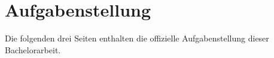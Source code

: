 \chapter{Aufgabenstellung}
\label{sec:aufgabenstellung}
Die folgenden drei Seiten enthalten die offizielle Aufgabenstellung dieser Bachelorarbeit.

